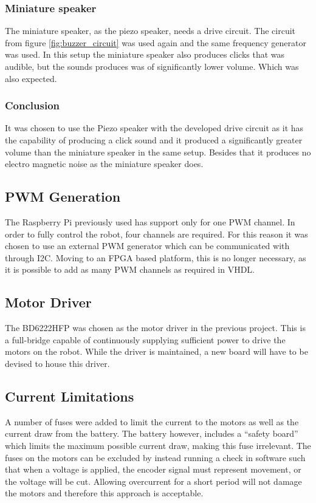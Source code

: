 \subsubsection*{Miniature speaker}
The miniature speaker, as the piezo speaker, needs a drive circuit. 
The circuit from figure \ref{fig:buzzer_circuit} was used again and the same frequency generator was used. 
In this setup the miniature speaker also produces clicks that was audible, but the sounds produces was of significantly lower volume.
Which was also expected.  

\subsubsection*{Conclusion}
It was chosen to use the Piezo speaker with the developed drive circuit as it has the capability of producing a click sound and it produced a significantly greater volume than the miniature speaker in the same setup. 
Besides that it produces no electro magnetic noise as the miniature speaker does. 

\subsection{PWM Generation} %
\label{sub:pwm_generation}
The Raspberry Pi previously used has support only for one PWM channel.
In order to fully control the robot, four channels are required.
For this reason it was chosen to use an external PWM generator which can be communicated with through I2C.
Moving to an FPGA based platform, this is no longer necessary, as it is possible to add as many PWM channels as required in VHDL\@.

\subsection{Motor Driver} %
\label{sub:motor_driver}
The BD6222HFP was chosen as the motor driver in the previous project.
This is a full-bridge capable of continuously supplying sufficient power to drive the motors on the robot.
While the driver is maintained, a new board will have to be devised to house this driver.

\subsection{Current Limitations} %
\label{sub:power_and_current_limitations}
A number of fuses were added to limit the current to the motors as well as the current draw from the battery.
The battery however, includes a ``safety board'' which limits the maximum possible current draw, making this fuse irrelevant.
The fuses on the motors can be excluded by instead running a check in software such that when a voltage is applied, the encoder signal must represent movement, or the voltage will be cut.
Allowing overcurrent for a short period will not damage the motors and therefore this approach is acceptable.

